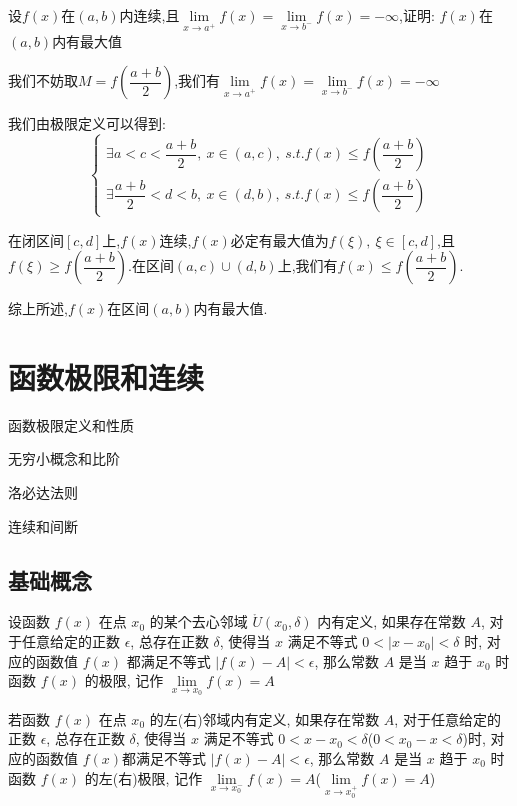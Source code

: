 \begin{proposition}
	设$f(x)$在$(a,b)$内连续,且$\lim\limits_{x\rightarrow a^{+}}f(x)=\lim\limits_{x\rightarrow b^{-}}f(x)=-\infty$,证明:  $f(x)$在$(a,b)$内有最大值
\end{proposition}
\begin{solution}
	
	我们不妨取$M=f(\dfrac{a+b}{2})$,我们有$\lim\limits_{x\rightarrow a^{+}}f(x)=\lim\limits_{x\rightarrow b^{-}}f(x)=-\infty$
	
	我们由极限定义可以得到:  
	$$\left\lbrace
	\begin{array}{l}
		\exists a<c<\dfrac{a+b}{2},\ x\in(a,c),\ s.t. f(x)\leq f(\dfrac{a+b}{2})\\
		\exists \dfrac{a+b}{2}<d<b,\ x\in(d,b),\ s.t. f(x)\leq f(\dfrac{a+b}{2})
	\end{array}
	\right. $$
	
	在闭区间$[c,d]$上,$f(x)$连续,$f(x)$必定有最大值为$f(\xi),\ \xi\in[c,d]$,且$f(\xi)\geq f(\dfrac{a+b}{2})$.在区间$(a,c)\cup (d,b)$上,我们有$f(x)\leq f(\dfrac{a+b}{2})$.
	
	综上所述,$f(x)$在区间$(a,b)$内有最大值.
\end{solution}




\chapter{函数极限和连续}
\begin{introduction}
	\item 函数极限定义和性质
	\item 无穷小概念和比阶
	\item 洛必达法则
	\item 连续和间断
\end{introduction}
\section{基础概念}
\begin{definition}[函数极限]
	设函数 $f(x)$ 在点 $x_{0}$ 的某个去心邻域 $\mathring{U}(x_{0},\delta)$ 内有定义, 如果存在常数 $A$, 对于任意给定的正数 $\epsilon$, 总存在正数 $\delta$, 使得当 $x$ 满足不等式 $0<|x-x_{0}|<\delta$ 时, 对应的函数值 $f(x)$ 都满足不等式 $|f(x)-A|<\epsilon$, 那么常数 $A$ 是当 $x$ 趋于 $x_{0}$ 时函数 $f(x)$ 的极限, 记作 $\lim\limits_{x\to x_{0}}f(x)=A$
\end{definition}

\begin{definition}[单侧极限]
	若函数 $f(x)$ 在点 $x_{0}$ 的左(右)邻域内有定义, 如果存在常数 $A$, 对于任意给定的正数 $\epsilon$, 总存在正数 $\delta$, 使得当 $x$ 满足不等式 $0<x-x_{0}<\delta$($0<x_{0}-x<\delta$)时, 对应的函数值 $f(x)$都满足不等式 $|f(x)-A|<\epsilon$, 那么常数 $A$ 是当 $x$ 趋于 $x_{0}$ 时函数 $f(x)$ 的左(右)极限, 记作 $\lim\limits_{x\to x_{0}^{-}}f(x)=A$($\lim\limits_{x\to x_{0}^{+}}f(x)=A$)
\end{definition}

